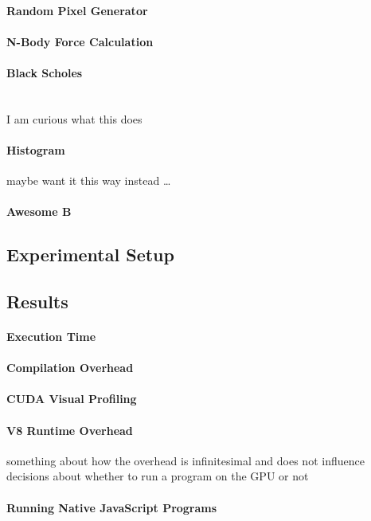 \paragraph{Random Pixel Generator}

\paragraph{N-Body Force Calculation}

\paragraph{Black Scholes} \hspace{0pt}\\
I am curious what this does


\paragraph{Histogram}
maybe want it this way instead \ldots

\paragraph{Awesome B}

\subsection{Experimental Setup}

\subsection{Results}

\paragraph{Execution Time}
\paragraph{Compilation Overhead}
\paragraph{CUDA Visual Profiling}
\paragraph{V8 Runtime Overhead}
something about how the overhead is infinitesimal and does not influence
decisions about whether to run a program on the GPU or not
\paragraph{Running Native JavaScript Programs}



